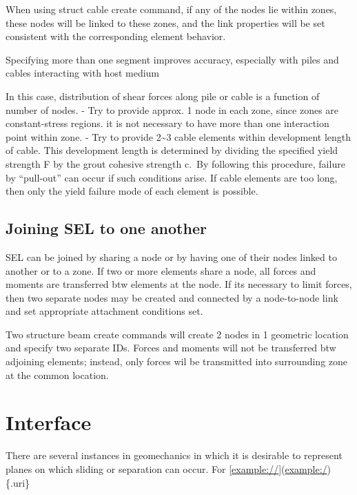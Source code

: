 \documentclass[a4paper, nobind]{templates/ociamthesis}
\begin{document}
When using struct cable create command, if any of the nodes lie within
zones, these nodes will be linked to these zones, and the link
properties will be set consistent with the corresponding element
behavior.

Specifying more than one segment improves accuracy, especially with
piles and cables interacting with host medium

In this case, distribution of shear forces along pile or cable is a
function of number of nodes. - Try to provide approx. 1 node in each
zone, since zones are constant-stress regions. it is not necessary to
have more than one interaction point within zone. - Try to provide 2\textasciitilde3
cable elements within development length of cable. This development
length is determined by dividing the specified yield strength F by the
grout cohesive strength c.~By following this procedure, failure by
``pull-out'' can occur if such conditions arise. If cable elements are too
long, then only the yield failure mode of each element is possible.

\hypertarget{joining-sel-to-one-another}{%
\subsection{Joining SEL to one another}\label{joining-sel-to-one-another}}

SEL can be joined by sharing a node or by having one of their nodes
linked to another or to a zone. If two or more elements share a node,
all forces and moments are transferred btw elements at the node. If its
necessary to limit forces, then two separate nodes may be created and
connected by a node-to-node link and set appropriate attachment
conditions set.

Two structure beam create commands will create 2 nodes in 1 geometric
location and specify two separate IDs. Forces and moments will not be
transferred btw adjoining elements; instead, only forces wil be
transmitted into surrounding zone at the common location.

\hypertarget{interface-1}{%
\section{Interface}\label{interface-1}}

There are several instances in geomechanics in which it is desirable to
represent planes on which sliding or separation can occur. For
{[}\url{example://}{]}(\url{example:/})\{.uri\}
\end{document}
